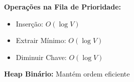 \documentclass[preview]{standalone}
\begin{document}
\begin{center}
\textbf{Operações na Fila de Prioridade:}
            \begin{itemize}
                \item Inserção: $O(\log V)$
                \item Extrair Mínimo: $O(\log V)$
                \item Diminuir Chave: $O(\log V)$
            \end{itemize}
            
            \textbf{Heap Binário:} Mantém ordem eficiente
\end{center}
\end{document}
